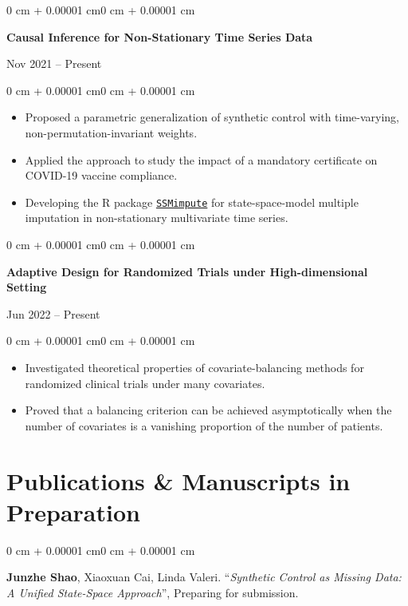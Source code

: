 \documentclass[10pt, letterpaper]{article}
\newenvironment{highlights}{
    \begin{itemize}[
        topsep=0.10 cm,
        parsep=0.10 cm,
        partopsep=0pt,
        itemsep=0pt,
        leftmargin=0 cm + 10pt
    ]
}{\end{itemize}}
\newenvironment{onecolentry}{
    \begin{adjustwidth}{0 cm + 0.00001 cm}{0 cm + 0.00001 cm}
}{\end{adjustwidth}}
\newenvironment{twocolentry}[2][]{
    \onecolentry
    \def\secondColumn{#2}
    \noindent\begin{minipage}[t]{\dimexpr\linewidth-4.7cm\relax}
}{
    \end{minipage}\hfill
    \begin{minipage}[t]{4.5cm}
        \raggedleft \secondColumn
    \end{minipage}
    \endonecolentry
}
\begin{document}
    \begin{twocolentry}{Nov 2021 -- Present}
        \textbf{Causal Inference for Non-Stationary Time Series Data}\\
    \end{twocolentry}
    \vspace{0.05 cm}
    \begin{onecolentry}
        \begin{highlights}
            \item Proposed a parametric generalization of synthetic control with time-varying, non-permutation-invariant weights.
            \item Applied the approach to study the impact of a mandatory certificate on COVID-19 vaccine compliance.
            \item Developing the R package \href{https://junzheshao5959.github.io/SSMimpute/}{\texttt{SSMimpute}} for state-space-model multiple imputation in non-stationary multivariate time series.
        \end{highlights}
    \end{onecolentry}

    \vspace{0.10 cm}
    \begin{twocolentry}{Jun 2022 -- Present}
        \textbf{Adaptive Design for Randomized Trials under High-dimensional Setting}\\
    \end{twocolentry}
    \vspace{0.05 cm}
    \begin{onecolentry}
        \begin{highlights}
            \item Investigated theoretical properties of covariate-balancing methods for randomized clinical trials under many covariates.
            \item Proved that a balancing criterion can be achieved asymptotically when the number of covariates is a vanishing proportion of the number of patients.
        \end{highlights}
    \end{onecolentry}

\vspace{0.10 cm}

\section{Publications \& Manuscripts in Preparation}
\begin{onecolentry}
    \textbf{Junzhe Shao}, Xiaoxuan Cai, Linda Valeri. ``\textit{Synthetic Control as Missing Data: A Unified State-Space Approach}'', Preparing for submission.
\end{onecolentry}
\vspace{0.20 cm}
\end{document}
